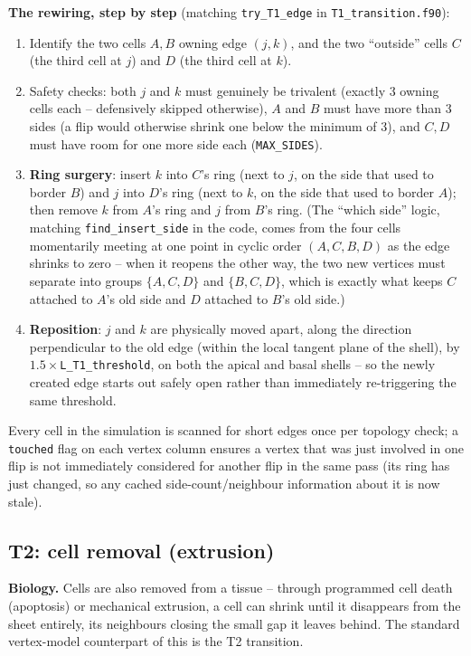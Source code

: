 \documentclass[11pt,a4paper]{report}
\begin{document}
\textbf{The rewiring, step by step} (matching
\texttt{try\_T1\_edge} in \texttt{T1\_transition.f90}):
\begin{enumerate}
  \item Identify the two cells $A,B$ owning edge $(j,k)$, and the two
  ``outside'' cells $C$ (the third cell at $j$) and $D$ (the third cell
  at $k$).
  \item Safety checks: both $j$ and $k$ must genuinely be trivalent
  (exactly 3 owning cells each -- defensively skipped otherwise), $A$
  and $B$ must have more than 3 sides (a flip would otherwise shrink
  one below the minimum of 3), and $C,D$ must have room for one more
  side each (\texttt{MAX\_SIDES}).
  \item \textbf{Ring surgery}: insert $k$ into $C$'s ring (next to $j$,
  on the side that used to border $B$) and $j$ into $D$'s ring (next to
  $k$, on the side that used to border $A$); then remove $k$ from $A$'s
  ring and $j$ from $B$'s ring. (The ``which side'' logic, matching
  \texttt{find\_insert\_side} in the code, comes from the four cells
  momentarily meeting at one point in cyclic order $(A,C,B,D)$ as the
  edge shrinks to zero -- when it reopens the other way, the two new
  vertices must separate into groups $\{A,C,D\}$ and $\{B,C,D\}$, which
  is exactly what keeps $C$ attached to $A$'s old side and $D$ attached
  to $B$'s old side.)
  \item \textbf{Reposition}: $j$ and $k$ are physically moved apart,
  along the direction perpendicular to the old edge (within the local
  tangent plane of the shell), by $1.5\times$\texttt{L\_T1\_threshold},
  on both the apical and basal shells -- so the newly created edge
  starts out safely open rather than immediately re-triggering the same
  threshold.
\end{enumerate}
Every cell in the simulation is scanned for short edges once per
topology check; a \texttt{touched} flag on each vertex column ensures a
vertex that was just involved in one flip is not immediately
considered for another flip in the same pass (its ring has just
changed, so any cached side-count/neighbour information about it is
now stale).

\subsection{T2: cell removal (extrusion)}
\label{sec:T2}
\textbf{Biology.} Cells are also removed from a tissue -- through
programmed cell death (apoptosis) or mechanical extrusion, a cell can
shrink until it disappears from the sheet entirely, its neighbours
closing the small gap it leaves behind. The standard vertex-model
counterpart of this is the T2 transition.
\end{document}
